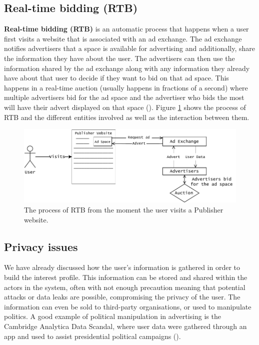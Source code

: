 \documentclass{l4proj}
\begin{document}
\subsection{Real-time bidding (RTB)}
\textbf{Real-time bidding (RTB)} is an automatic process that happens when a user first visits a website that is associated with an ad exchange. The ad exchange notifies advertisers that a space is available for advertising and additionally, share the information they have about the user. The advertisers can then use the information shared by the ad exchange along with any information they already have about that user to decide if they want to bid on that ad space. This happens in a real-time auction (usually happens in fractions of a second) where multiple advertisers bid for the ad space and the advertiser who bids the most will have their advert displayed on that space (\cite{RTB}). Figure \ref{fig:rtb} shows the process of RTB and the different entities involved as well as the interaction between them.

\begin{figure}
    \centering
    \includegraphics[width=1\linewidth]{images/RTB.pdf}    

    \caption{The process of RTB from the moment the user visits a Publisher website. }

    \label{fig:rtb} 
\end{figure}

\subsection{Privacy issues}
We have already discussed how the user's information is gathered in order to build the interest profile. This information can be stored and shared within the actors in the system, often with not enough precaution meaning that potential attacks or data leaks are possible, compromising the privacy of the user. The information can even be sold to third-party organisations, or used to manipulate politics. A good example of political manipulation in advertising is the Cambridge Analytica Data Scandal, where user data were gathered through an app and used to assist presidential political campaigns (\cite{cambridge}).
\end{document}
